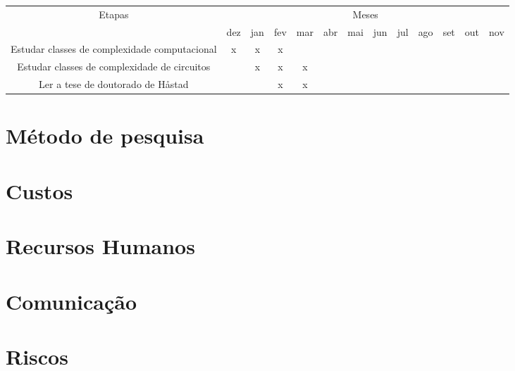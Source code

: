 \documentclass[12pt]{article}
\begin{document}
    \begin{tabular}{|c|c|c|c|c|c|c|c|c|c|c|c|c|}
        \hline
        \multirow{2}{*}{Etapas} & \multicolumn{12}{|c|}{Meses}\\ \cline{2-13}
                        & dez & jan & fev & mar & abr & mai & jun & jul & ago & set & out & nov \\ \hline
        Estudar classes
        de complexidade
        computacional   &  x  &  x  &  x  &     &     &     &     &     &     &     &     &     \\ \hline
        Estudar classes
        de complexidade
        de circuitos    &     &  x  &  x  &  x  &     &     &     &     &     &     &     &     \\ \hline
        Ler a tese de
        doutorado de
        Håstad          &     &     &  x  &  x  &     &     &     &     &     &     &     &     \\ \hline

    \end{tabular}

\section{Método de pesquisa}
    \blindtext[3]

\section{Custos}
    \blindtext[1]

\section{Recursos Humanos}
    \blindtext[1]

\section{Comunicação}
    \blindtext[1]

\section{Riscos}
    \blindtext[1]



\end{document}
